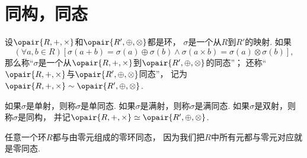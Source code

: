 \section{同构，同态}
\begin{definition}
设\(\opair{R,+,\times}\)和\(\opair{R',\oplus,\otimes}\)都是环，
\(\sigma\)是一个从\(R\)到\(R'\)的映射.
如果\[
	(\forall a,b\in R)[
		\sigma(a+b)=\sigma(a)\oplus\sigma(b)
		\land
		\sigma(a \times b)=\sigma(a)\otimes\sigma(b)
	],
\]
那么称“\(\sigma\)是一个从\(\opair{R,+,\times}\)到\(\opair{R',\oplus,\otimes}\)的同态”；
还称“\(\opair{R,+,\times}\)与\(\opair{R',\oplus,\otimes}\)同态”，
记为\(\opair{R,+,\times} \sim \opair{R',\oplus,\otimes}\).

如果\(\sigma\)是单射，则称\(\sigma\)是单同态.
如果\(\sigma\)是满射，则称\(\sigma\)是满同态.
如果\(\sigma\)是双射，则称\(\sigma\)是同构，
并记\(\opair{R,+,\times} \simeq \opair{R',\oplus,\otimes}\).
\end{definition}

任意一个环\(R\)都与由零元组成的零环同态，
因为我们把\(R\)中所有元都与零元对应就是零同态.
